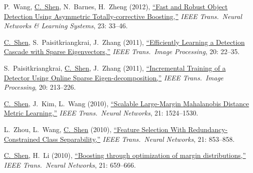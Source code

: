 \documentclass[9pt, a4paper]{article}
\newcommand{\years}[1]{\marginnote{\scriptsize #1}}
\def\highlight{\uline}
\begin{document}
\medskip

\years{2012} P.~Wang, \highlight{C.~Shen}, N.~Barnes, H.~Zheng (2012),
\href{http://www.google.com/search?lr=&ie=UTF-8&oe=UTF-8&q=Fast+and+Robust+Object+Detection+Using+Asymmetric+Totally-corrective+Boosting+Peng+Wang%2C+Chunhua+Shen%2C+Nick+Barnes%2C+Hong+Zheng}{``Fast and Robust Object Detection Using Asymmetric Totally-corrective Boosting,{}''}
\emph{IEEE Trans.\  Neural Networks \& Learning Systems}, 23: 33--46.

\medskip

\years{2011} \highlight{C.~Shen}, S.~Paisitkriangkrai, J.~Zhang (2011),
\href{http://www.google.com/search?lr=&ie=UTF-8&oe=UTF-8&q=Efficiently+Learning+a+Detection+Cascade+with+Sparse+Eigenvectors+Chunhua+Shen%2C+Sakrapee+Paisitkriangkrai%2C+Jian+Zhang}{``Efficiently Learning a Detection Cascade with Sparse Eigenvectors,{}''}
\emph{IEEE Trans.\  Image Processing}, 20: 22--35.

\medskip

\years{2011} S.~Paisitkriangkrai, \highlight{C.~Shen}, J.~Zhang (2011),
\href{http://www.google.com/search?lr=&ie=UTF-8&oe=UTF-8&q=Incremental+Training+of+a+Detector+Using+Online+Sparse+Eigen-decomposition+Sakrapee+Paisitkriangkrai%2C+Chunhua+Shen%2C+Jian+Zhang}{``Incremental Training of a Detector Using Online Sparse Eigen-decomposition,{}''}
\emph{IEEE Trans.\  Image Processing}, 20: 213--226.

\medskip

\years{2010} \highlight{C.~Shen}, J.~Kim, L.~Wang (2010),
\href{http://www.google.com/search?lr=&ie=UTF-8&oe=UTF-8&q=Scalable+Large-Margin+Mahalanobis+Distance+Metric+Learning+Chunhua+Shen%2C+Junae+Kim%2C+Lei+Wang}{``Scalable Large-Margin {M}ahalanobis Distance Metric Learning,{}''}
\emph{IEEE Trans.\  Neural Networks}, 21: 1524--1530.

\medskip

\years{2010} L.~Zhou, L.~Wang, \highlight{C.~Shen} (2010),
\href{http://www.google.com/search?lr=&ie=UTF-8&oe=UTF-8&q=Feature+Selection+With+Redundancy-Constrained+Class+Separability+Luping+Zhou%2C+Lei+Wang%2C+Chunhua+Shen}{``Feature Selection With Redundancy-Constrained Class Separability,{}''}
\emph{IEEE Trans.\  Neural Networks}, 21: 853--858.

\medskip

\years{2010} \highlight{C.~Shen}, H.~Li (2010),
\href{http://www.google.com/search?lr=&ie=UTF-8&oe=UTF-8&q=Boosting+through+optimization+of+margin+distributions+Chunhua+Shen%2C+Hanxi+Li}{``Boosting through optimization of margin distributions,{}''}
\emph{IEEE Trans.\  Neural Networks}, 21: 659--666.
\end{document}
